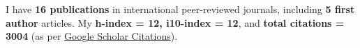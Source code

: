 \hfill
\par
I have \textbf{16 publications} in international peer-reviewed journals, including \textbf{5 first author} articles. My \textbf{h-index = 12, i10-index = 12}, and \textbf{total citations = 3004} (as per \href{https://scholar.google.com/citations?hl=en&user=6-7FYjIAAAAJ&authuser=2}{Google Scholar Citations}).

\nocite{*}


\printbibliography[heading={subbibliography},title={Published},type=article]

\printbibliography[heading={subbibliography},title={In Review},type=misc]


